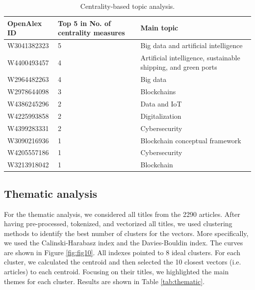 \documentclass[a4paper, review, endfloat, doubleblind, authoryear]{elsarticle}
\begin{document}
	\begin{table}[h]
		\centering
		\caption{Centrality-based topic analysis.}
		\begin{tabularx}{\linewidth}{XXX}
			\hline
			OpenAlex ID & Top 5 in No. of centrality measures & Main topic \\
			\hline
			W3041382323	& 5 & Big data and artificial intelligence\\
			W4400493457	& 4 & Artificial intelligence, sustainable shipping, and green ports\\
			W2964482263	& 4 & Big data\\
			W2978644098	& 3 & Blockchains\\
			W4386245296	& 2 & Data and IoT\\
			W4225993858	& 2 & Digitalization\\
			W4399283331	& 2 & Cybersecurity\\
			W3090216936	& 1 & Blockchain conceptual framework\\
			W4205557186	& 1 & Cybersecurity\\
			W3213918042	& 1 & Blockchain\\
			\hline
		\end{tabularx}
		\label{tab:citationcentrality}
	\end{table}
		
	\subsection{Thematic analysis}
	For the thematic analysis, we considered all titles from the 2290 articles. After having pre-processed, tokenized, and vectorized all titles, we used clustering methods to identify the best number of clusters for the vectors. More specifically, we used the Calinski-Harabasz index and the Davies-Bouldin index. The curves are shown in Figure \ref{fig:fig10}. All indexes pointed to 8 ideal clusters. For each cluster, we calculated the centroid and then selected the 10 closest vectors (i.e. articles) to each centroid. Focusing on their titles, we highlighted the main themes for each cluster. Results are shown in Table \ref{tab:thematic}.
	
\end{document}
